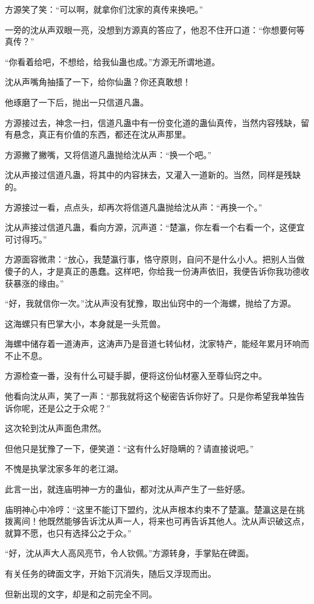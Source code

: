 \begin{this_body}
方源笑了笑：“可以啊，就拿你们沈家的真传来换吧。”

一旁的沈从声双眼一亮，没想到方源真的答应了，他忍不住开口道：“你想要何等真传？”

“你看着给吧，不想给，给我仙蛊也成。”方源无所谓地道。

沈从声嘴角抽搐了一下，给你仙蛊？你还真敢想！

他琢磨了一下后，抛出一只信道凡蛊。

方源接过去，神念一扫，信道凡蛊中有一份变化道的蛊仙真传，当然内容残缺，留有悬念，真正有价值的东西，都还在沈从声那里。

方源撇了撇嘴，又将信道凡蛊抛给沈从声：“换一个吧。”

沈从声接过信道凡蛊，将其中的内容抹去，又灌入一道新的。当然，同样是残缺的。

方源接过一看，点点头，却再次将信道凡蛊抛给沈从声：“再换一个。”

沈从声接过信道凡蛊，看向方源，沉声道：“楚瀛，你左看一个右看一个，这便宜可讨得巧。”

方源面容微肃：“放心，我楚瀛行事，恪守原则，自问不是什么小人。把别人当做傻子的人，才是真正的愚蠢。这样吧，你给我一份涛声依旧，我便告诉你我功德收获暴涨的缘由。”

“好，我就信你一次。”沈从声没有犹豫，取出仙窍中的一个海螺，抛给了方源。

这海螺只有巴掌大小，本身就是一头荒兽。

海螺中储存着一道涛声，这涛声乃是音道七转仙材，沈家特产，能经年累月环响而不止不息。

方源检查一番，没有什么可疑手脚，便将这份仙材塞入至尊仙窍之中。

他看向沈从声，笑了一声：“那我就将这个秘密告诉你好了。只是你希望我单独告诉你呢，还是公之于众呢？”

这次轮到沈从声面色肃然。

但他只是犹豫了一下，便笑道：“这有什么好隐瞒的？请直接说吧。”

不愧是执掌沈家多年的老江湖。

此言一出，就连庙明神一方的蛊仙，都对沈从声产生了一些好感。

庙明神心中冷哼：“这里不能订下盟约，沈从声根本约束不了楚瀛。楚瀛这是在挑拨离间！他既然能够告诉沈从声一人，将来也可再告诉其他人。沈从声识破这点，就算不愿，也只有选择公之于众。”

“好，沈从声大人高风亮节，令人钦佩。”方源转身，手掌贴在碑面。

有关任务的碑面文字，开始下沉消失，随后又浮现而出。

但新出现的文字，却是和之前完全不同。


\end{this_body}
